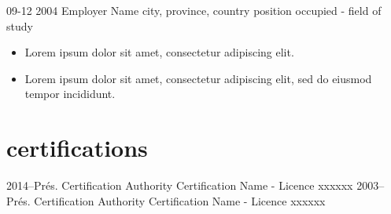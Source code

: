 \documentclass[print]{friggos-cv} %
\begin{document}
\begin{entrylist}
  \entryBul
    {09-12 2004}
    {Employer Name}
    {city, province, country}
    {position occupied - field of study}
    {
     \begin{itemize}[leftmargin=*]
       \setlength\itemsep{0pt}
       \item Lorem ipsum dolor sit amet, consectetur adipiscing elit.
       \item Lorem ipsum dolor sit amet, consectetur adipiscing elit, sed do eiusmod tempor incididunt.
     \end{itemize}
     }
\end{entrylist}

\newpage
\section{certifications}
  \begin{entrylist}
    \entryFULL
      {2014--Prés.}
      {Certification Authority}
      {}
      {Certification Name - Licence xxxxxx}
      {}
    \entryFULL
      {2003--Prés.}
      {Certification Authority}
      {}
      {Certification Name - Licence xxxxxx}
      {}
\end{entrylist}


\end{document}
